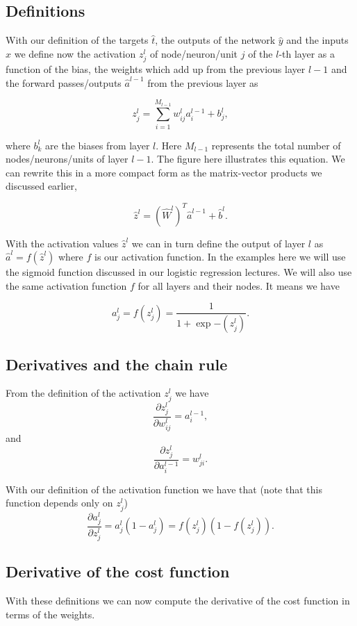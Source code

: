 \documentclass[%
oneside,                 %
final,                   %
10pt]{article}
\begin{document}
\subsection*{Definitions}

With our definition of the targets $\hat{t}$, the outputs of the
network $\hat{y}$ and the inputs $\hat{x}$ we
define now the activation $z_j^l$ of node/neuron/unit $j$ of the
$l$-th layer as a function of the bias, the weights which add up from
the previous layer $l-1$ and the forward passes/outputs
$\hat{a}^{l-1}$ from the previous layer as


\[
z_j^l = \sum_{i=1}^{M_{l-1}}w_{ij}^la_i^{l-1}+b_j^l,
\]

where $b_k^l$ are the biases from layer $l$.  Here $M_{l-1}$
represents the total number of nodes/neurons/units of layer $l-1$. The
figure here illustrates this equation.  We can rewrite this in a more
compact form as the matrix-vector products we discussed earlier,

\[
\hat{z}^l = \left(\hat{W}^l\right)^T\hat{a}^{l-1}+\hat{b}^l.
\]

With the activation values $\hat{z}^l$ we can in turn define the
output of layer $l$ as $\hat{a}^l = f(\hat{z}^l)$ where $f$ is our
activation function. In the examples here we will use the sigmoid
function discussed in our logistic regression lectures. We will also use the same activation function $f$ for all layers
and their nodes.  It means we have

\[
a_j^l = f(z_j^l) = \frac{1}{1+\exp{-(z_j^l)}}.
\]


\subsection*{Derivatives and the chain rule}

From the definition of the activation $z_j^l$ we have
\[
\frac{\partial z_j^l}{\partial w_{ij}^l} = a_i^{l-1},
\]
and
\[
\frac{\partial z_j^l}{\partial a_i^{l-1}} = w_{ji}^l. 
\]

With our definition of the activation function we have that (note that this function depends only on $z_j^l$)
\[
\frac{\partial a_j^l}{\partial z_j^{l}} = a_j^l(1-a_j^l)=f(z_j^l)(1-f(z_j^l)). 
\]


\subsection*{Derivative of the cost function}

With these definitions we can now compute the derivative of the cost function in terms of the weights.
\end{document}
